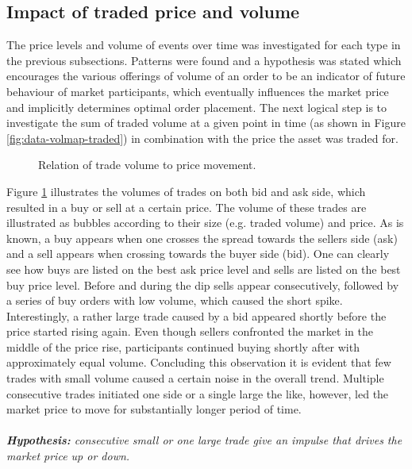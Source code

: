 \subsection{Impact of traded price and volume}
\label{sec:data-hypthesis-trade-price-volume}

The price levels and volume of events over time was investigated for each type in the previous subsections.
Patterns were found and a hypothesis was stated which encourages the various offerings of volume of an order to be an indicator of future behaviour of market participants, which eventually influences the market price and implicitly determines optimal order placement.
The next logical step is to investigate the sum of traded volume at a given point in time (as shown in Figure \ref{fig:data-volmap-traded}) in combination with the price the asset was traded for.

\begin{figure}[H]
    \centering
    \caption{Relation of trade volume to price movement.}
    \label{fig:data-trade-volume}
\end{figure}

Figure \ref{fig:data-trade-volume} illustrates the volumes of trades on both bid and ask side, which resulted in a buy or sell at a certain price.
The volume of these trades are illustrated as bubbles according to their size (e.g. traded volume) and price.
As is known, a buy appears when one crosses the spread towards the sellers side (ask) and a sell appears when crossing towards the buyer side (bid).
One can clearly see how buys are listed on the best ask price level and sells are listed on the best buy price level.
Before and during the dip sells appear consecutively, followed by a series of buy orders with low volume, which caused the short spike.
Interestingly, a rather large trade caused by a bid appeared shortly before the price started rising again.
Even though sellers confronted the market in the middle of the price rise, participants continued buying shortly after with approximately equal volume.
Concluding this observation it is evident that few trades with small volume caused a certain noise in the overall trend.
Multiple consecutive trades initiated one side or a single large the like, however, led the market price to move for substantially longer period of time.
\\
\\
\textit{\textbf{Hypothesis:} consecutive small or one large trade give an impulse that drives the market price up or down.}


